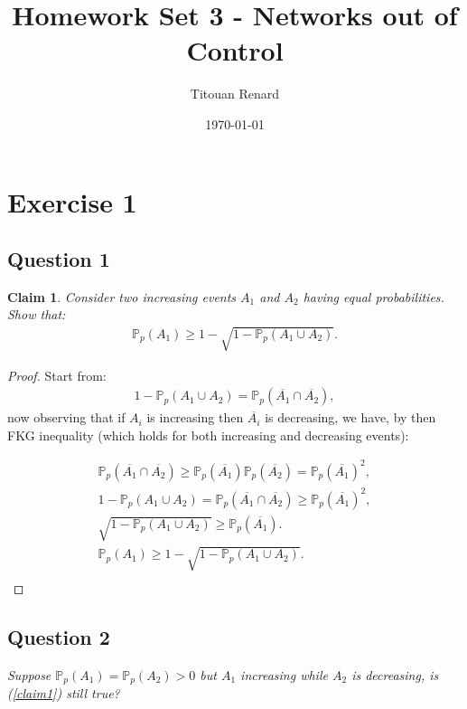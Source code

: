 \documentclass[11pt]{article}
\title{Homework Set 3 - Networks out of Control}
\date{\today}
\author{Titouan Renard}
\newtheorem{claim}{Claim}
\begin{document}
\maketitle	

\section*{Exercise 1}
\subsection*{Question 1}


\begin{claim}
    Consider two increasing events $A_1$ and $A_2$ having equal probabilities. Show that: 
    \begin{align}
        \mathbb{P}_p(A_1) \geq 1 - \sqrt{1 - \mathbb{P}_p(A_1 \cup A_2)} . \label{claim1}
    \end{align}
\end{claim}

\begin{proof}
    Start from:
    \begin{align*}
        1 - \mathbb{P}_p(A_1 \cup A_2) = \mathbb{P}_p(\overline{A_1} \cap \overline{A_2}),
    \end{align*}
    now observing that if $A_i$ is increasing then $\overline{A_i}$ is decreasing, we have, by then FKG inequality (which holds for both increasing and decreasing events):
    
    \begin{align*}
        \mathbb{P}_p(\overline{A_1} \cap \overline{A_2}) \geq \mathbb{P}_p(\overline{A_1}) \mathbb{P}_p(\overline{A_2}) = \mathbb{P}_p(\overline{A_1})^2, \\
        1 - \mathbb{P}_p(A_1 \cup A_2) = \mathbb{P}_p(\overline{A_1} \cap \overline{A_2}) \geq \mathbb{P}_p(\overline{A_1})^2, \\
        \sqrt{1 - \mathbb{P}_p(A_1 \cup A_2)} \geq \mathbb{P}_p(\overline{A_1}). \\
        \mathbb{P}_p(A_1)  \geq 1 - \sqrt{1 - \mathbb{P}_p(A_1 \cup A_2)}. \\
    \end{align*}
\end{proof}

\subsection*{Question 2} 
\textit{Suppose $\mathbb{P}_p(A_1) = \mathbb{P}_p(A_2) > 0$ but $A_1$ increasing while $A_2$ is decreasing, is (\ref{claim1}) still true?}\\
\end{document}
